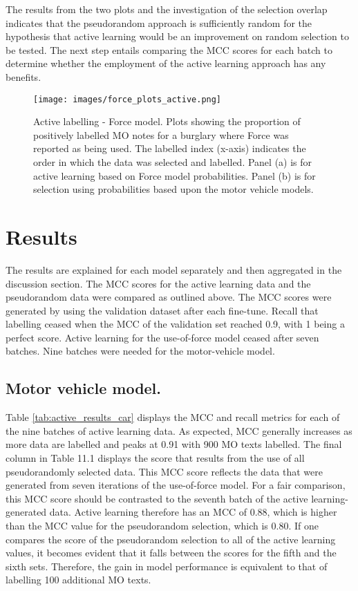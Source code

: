 The results from the two plots and the investigation of the selection overlap indicates that the pseudorandom approach is sufficiently random for the hypothesis that active learning would be an improvement on random selection to be tested. The next step entails comparing the MCC scores for each batch to determine whether the employment of the active learning approach has any benefits.



\begin{figure}[!ht]
  \centering
    \texttt{[image: images/force\_plots\_active.png]}
    \caption[Active labelling - Force model.]{{Active labelling - Force model.} Plots showing the proportion of positively labelled MO notes for a burglary where Force was reported as being used. The labelled index (x-axis) indicates the order in which the data was selected and labelled. Panel (a) is for active learning based on Force model probabilities. Panel (b) is for selection using probabilities based upon the motor vehicle models.}
    \label{fig:active_force}
\end{figure}


\section{Results} The results are explained for each model separately and then aggregated in the discussion section. The MCC scores for the active learning data and the pseudorandom data were compared as outlined above. The MCC scores were generated by using the validation dataset after each fine-tune. Recall that labelling ceased when the MCC of the validation set reached 0.9, with 1 being a perfect score. Active learning for the use-of-force model ceased after seven batches. Nine batches were needed for the motor-vehicle model. 

\subsection{Motor vehicle model.} Table \ref{tab:active_results_car} displays the MCC and recall metrics for each of the nine batches of active learning data. As expected, MCC generally increases as more data are labelled and peaks at 0.91 with 900 MO texts labelled. The final column in Table 11.1 displays the score that results from the use of all pseudorandomly selected data. This MCC score reflects the data that were generated from seven iterations of the use-of-force model. For a fair comparison, this MCC score should be contrasted to the seventh batch of the active learning-generated data. Active learning therefore has an MCC of 0.88, which is higher than the MCC value for the pseudorandom selection, which is 0.80. If one compares the score of the pseudorandom selection to all of the active learning values, it becomes evident that it falls between the scores for the fifth and the sixth sets. Therefore, the gain in model performance is equivalent to that of labelling 100 additional MO texts.

